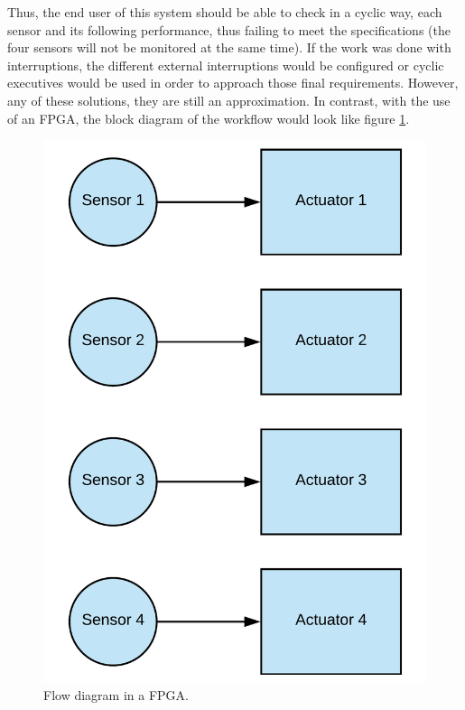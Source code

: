 Thus, the end user of this system should be able to check in a cyclic way, each sensor and its following performance, thus failing to meet the specifications (the four sensors will not be monitored at the same time).
If the work was done with interruptions, the different external interruptions would be configured or cyclic executives would be used in order to approach those final requirements. However, any of these solutions, they are still an approximation.\newline
In contrast, with the use of an FPGA, the block diagram of the workflow would look like figure \ref{fig:fpga_sensor}.

\begin{center}
	\begin{figure}[H]
		\center
		\includegraphics[trim = 0mm 0mm 0mm 0mm, clip,scale=0.3]{imagenes/EstadoArte/fpga_sensor.pdf}
		\caption{Flow diagram in a FPGA.}
		\label{fig:fpga_sensor}
	\end{figure}
\end{center} 


